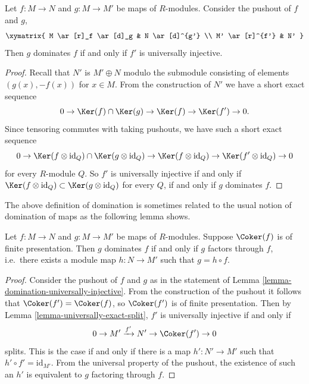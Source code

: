 \begin{lemma}
\label{lemma-domination-universally-injective}
Let $f : M \to N$ and $g : M \to M'$ be maps of $R$-modules.
Consider the pushout of $f$ and $g$,
$$
\xymatrix{
M  \ar[r]_f \ar[d]_g & N \ar[d]^{g'} \\
M' \ar[r]^{f'} & N'
}
$$
Then $g$ dominates $f$ if and only if $f'$ is universally injective.
\end{lemma}

\begin{proof}
Recall that $N'$ is $M' \oplus N$ modulo the submodule consisting of elements
$(g(x), -f(x))$ for $x \in M$.
From the construction of $N'$ we have a short exact sequence
$$
0 \to \Ker(f) \cap \Ker(g) \to \Ker(f) \to \Ker(f')
\to 0.
$$
Since tensoring commutes with taking pushouts, we have such a short exact
sequence
$$
0 \to \Ker(f \otimes \text{id}_Q ) \cap \Ker(g \otimes
\text{id}_Q) \to \Ker(f \otimes \text{id}_Q)
\to \Ker(f' \otimes \text{id}_Q) \to 0
$$
for every $R$-module $Q$.  So $f'$ is universally injective if and only if
$\Ker(f \otimes \text{id}_Q ) \subset \Ker(g \otimes
\text{id}_Q)$ for every $Q$, if and only if $g$ dominates $f$.
\end{proof}

\noindent
The above definition of domination is sometimes related to the usual notion
of domination of maps as the following lemma shows.

\begin{lemma}
\label{lemma-domination}
Let $f: M \to N$ and $g: M \to M'$ be maps of $R$-modules.
Suppose $\Coker(f)$ is of finite presentation.  Then $g$ dominates $f$ if
and
only if $g$ factors through $f$, i.e.\ there exists a module map $h: N
\to M'$ such that $g = h \circ f$.
\end{lemma}

\begin{proof}
Consider the pushout of $f$ and $g$ as in the statement of
Lemma \ref{lemma-domination-universally-injective}.
From the construction of the pushout it follows that
$\Coker(f') = \Coker(f)$, so $\Coker(f')$ is of finite
presentation.  Then by
Lemma \ref{lemma-universally-exact-split}, $f'$ is universally injective if and
only if
$$
0 \to M' \xrightarrow{f'} N' \to \Coker(f') \to 0
$$
splits. This is the case if and only if there is a map $h' : N' \to M'$
such that $h' \circ f' = \text{id}_{M'}$.  From the universal
property of the pushout, the existence of such an $h'$ is equivalent to $g$
factoring through $f$.
\end{proof}


